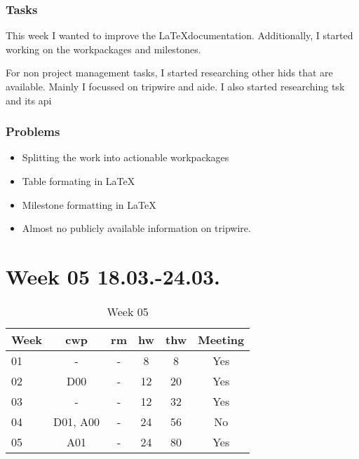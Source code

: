 \subsubsection{Tasks}

This week I wanted to improve the \LaTeX documentation. Additionally, I started working on the workpackages and milestones.

For non project management tasks, I started researching other \gls{hids} that are available. Mainly I focussed on tripwire and aide. I also started researching \gls{tsk} and its \gls{api}

\subsubsection{Problems}

\begin{itemize}
    \item Splitting the work into actionable workpackages
    \item Table formating in \LaTeX
    \item Milestone formatting in \LaTeX
    \item Almost no publicly available information on tripwire.

\end{itemize}

\section{Week 05 18.03.-24.03.}
\label{sec:journal:week05}

\begin{table}[!ht]
    \begin{center}
        \caption{Week 05}
        \label{tab:journal:week05}
        \begin{tabular}{l|c|c|c|c|c}
            \textbf{Week} & \textbf{\gls{cwp}} & \textbf{\gls{rm}} & \textbf{\gls{hw}} & \textbf{\gls{thw}} & \textbf{Meeting}\\
        \hline
        01 & - & - & 8 & 8 & Yes \\
        02 & D00 & - & 12 & 20 & Yes \\
        03 & - & - & 12 & 32 & Yes \\
        04 & D01, A00 & - & 24 & 56 & No \\
        05 & A01 & - & 24 & 80 & Yes \\
        \end{tabular}
    \end{center}
\end{table}

